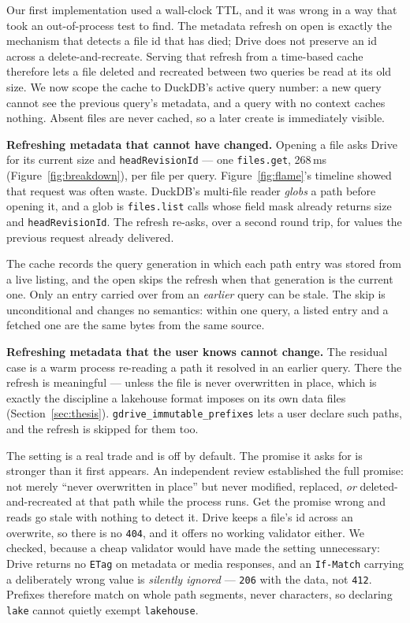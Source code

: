 \documentclass[sigconf, nonacm]{acmart}
\begin{document}
Our first implementation used a wall-clock TTL, and it was wrong in a way that
took an out-of-process test to find. The metadata refresh on open is exactly
the mechanism that detects a file id that has died; Drive does not preserve
an id across a delete-and-recreate. Serving that refresh from a time-based
cache therefore lets a file deleted and recreated between two queries be read
at its old size. We now scope the cache to DuckDB's active query number: a new
query cannot see the previous query's metadata, and a query with no context
caches nothing. Absent files are never cached, so a later create is
immediately visible.

\textbf{Refreshing metadata that cannot have changed.}
\label{sec:skiprefresh}
Opening a file asks Drive for its current size and \texttt{headRevisionId} ---
one \texttt{files.get}, 268\,ms (Figure~\ref{fig:breakdown}), per file per
query. Figure~\ref{fig:flame}'s timeline showed that request was often waste.
DuckDB's multi-file reader \emph{globs} a path before opening it, and a glob is
\texttt{files.list} calls whose field mask already returns size and
\texttt{headRevisionId}. The refresh re-asks, over a second round trip, for
values the previous request already delivered.

The cache records the query generation in which each path entry was stored
from a live listing, and the open skips the refresh when that generation is the
current one. Only an entry carried over from an \emph{earlier} query can be
stale. The skip is unconditional and changes no semantics: within one query,
a listed entry and a fetched one are the same bytes from the same source.

\textbf{Refreshing metadata that the user knows cannot change.}
The residual case is a warm process re-reading a path it resolved in an earlier
query. There the refresh is meaningful --- unless the file is never overwritten
in place, which is exactly the discipline a lakehouse format imposes on its own
data files (Section~\ref{sec:thesis}). \texttt{gdrive\_immutable\_prefixes}
lets a user declare such paths, and the refresh is skipped for them too.

The setting is a real trade and is off by default. The promise it asks for is
stronger than it first appears. An independent review established the full
promise: not merely ``never overwritten in place'' but never modified,
replaced, \emph{or} deleted-and-recreated at that path while the process runs.
Get the promise wrong and reads go stale with nothing to detect it. Drive keeps
a file's id across an overwrite, so there is no \texttt{404}, and it offers no
working validator either. We checked, because a cheap validator would have made
the setting unnecessary: Drive returns no \texttt{ETag} on metadata or media
responses, and an \texttt{If-Match} carrying a deliberately wrong value is
\emph{silently ignored} --- \texttt{206} with the data, not \texttt{412}.
Prefixes therefore match on whole path segments, never characters, so
declaring \texttt{lake} cannot quietly exempt
\texttt{lakehouse}.
\end{document}
